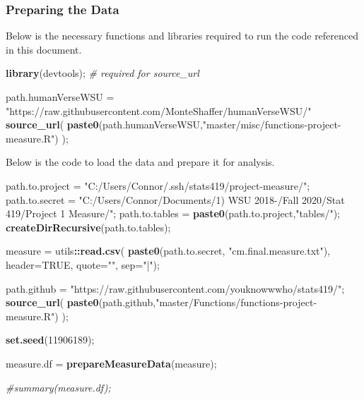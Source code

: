 \documentclass[]{article}
\newenvironment{Shaded}{\begin{snugshade}}{\end{snugshade}}
\newcommand{\CommentTok}[1]{\textcolor[rgb]{0.56,0.35,0.01}{\textit{#1}}}
\newcommand{\DataTypeTok}[1]{\textcolor[rgb]{0.13,0.29,0.53}{#1}}
\newcommand{\DecValTok}[1]{\textcolor[rgb]{0.00,0.00,0.81}{#1}}
\newcommand{\KeywordTok}[1]{\textcolor[rgb]{0.13,0.29,0.53}{\textbf{#1}}}
\newcommand{\NormalTok}[1]{#1}
\newcommand{\OperatorTok}[1]{\textcolor[rgb]{0.81,0.36,0.00}{\textbf{#1}}}
\newcommand{\OtherTok}[1]{\textcolor[rgb]{0.56,0.35,0.01}{#1}}
\newcommand{\StringTok}[1]{\textcolor[rgb]{0.31,0.60,0.02}{#1}}
\begin{document}
\subsubsection{Preparing the Data}
\label{sec:appendix-setup2}

Below is the necessary functions and libraries required to run the code
referenced in this document.

\begin{Shaded}
\begin{Highlighting}[]
\KeywordTok{library}\NormalTok{(devtools); }\CommentTok{# required for source_url}

\NormalTok{path.humanVerseWSU =}\StringTok{ "https://raw.githubusercontent.com/MonteShaffer/humanVerseWSU/"}
\KeywordTok{source_url}\NormalTok{( }\KeywordTok{paste0}\NormalTok{(path.humanVerseWSU,}\StringTok{"master/misc/functions-project-measure.R"}\NormalTok{) );}
\end{Highlighting}
\end{Shaded}

Below is the code to load the data and prepare it for analysis.

\begin{Shaded}
\begin{Highlighting}[]
\NormalTok{path.to.project =}\StringTok{ "C:/Users/Connor/.ssh/stats419/project-measure/"}\NormalTok{;}
\NormalTok{path.to.secret =}\StringTok{ }
\StringTok{  "C:/Users/Connor/Documents/1) WSU 2018-/Fall 2020/Stat 419/Project 1 Measure/"}\NormalTok{;}
\NormalTok{path.to.tables =}\StringTok{ }\KeywordTok{paste0}\NormalTok{(path.to.project,}\StringTok{"tables/"}\NormalTok{);}
  \KeywordTok{createDirRecursive}\NormalTok{(path.to.tables);}

\NormalTok{measure =}\StringTok{ }\NormalTok{utils}\OperatorTok{::}\KeywordTok{read.csv}\NormalTok{( }\KeywordTok{paste0}\NormalTok{(path.to.secret, }\StringTok{"cm.final.measure.txt"}\NormalTok{), }\DataTypeTok{header=}\OtherTok{TRUE}\NormalTok{, }
                          \DataTypeTok{quote=}\StringTok{""}\NormalTok{, }\DataTypeTok{sep=}\StringTok{"|"}\NormalTok{);}

\NormalTok{path.github =}\StringTok{ "https://raw.githubusercontent.com/youknowwwho/stats419/"}\NormalTok{;}
\KeywordTok{source_url}\NormalTok{( }\KeywordTok{paste0}\NormalTok{(path.github,}\StringTok{"master/Functions/functions-project-measure.R"}\NormalTok{) );}

\KeywordTok{set.seed}\NormalTok{(}\DecValTok{11906189}\NormalTok{);}

\NormalTok{measure.df =}\StringTok{ }\KeywordTok{prepareMeasureData}\NormalTok{(measure);}

\CommentTok{#summary(measure.df);}
\end{Highlighting}
\end{Shaded}
\end{document}
